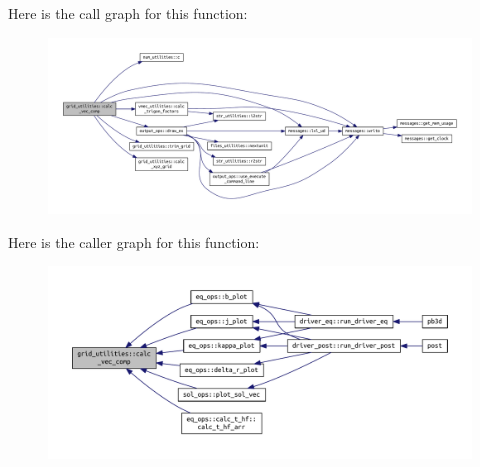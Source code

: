 Here is the call graph for this function\+:\nopagebreak
\begin{figure}[H]
\begin{center}
\leavevmode
\includegraphics[width=350pt]{namespacegrid__utilities_ad3d9386b9abcb1a7e17369a1b3a3750d_cgraph}
\end{center}
\end{figure}
Here is the caller graph for this function\+:
\nopagebreak
\begin{figure}[H]
\begin{center}
\leavevmode
\includegraphics[width=350pt]{namespacegrid__utilities_ad3d9386b9abcb1a7e17369a1b3a3750d_icgraph}
\end{center}
\end{figure}
\mbox{\label{namespacegrid__utilities_a39e7cd9b8f173994358dbdd6b57827e1}} 
